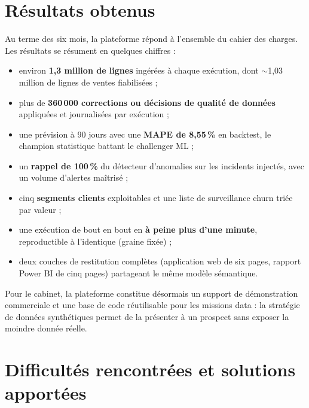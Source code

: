 \documentclass[12pt,a4paper]{report}
\begin{document}
\section{Résultats obtenus}

Au terme des six mois, la plateforme répond à l'ensemble du cahier des
charges. Les résultats se résument en quelques chiffres :

\begin{itemize}
  \item environ \textbf{1,3 million de lignes} ingérées à chaque exécution,
    dont $\sim$1,03 million de lignes de ventes fiabilisées ;
  \item plus de \textbf{360\,000 corrections ou décisions de qualité de
    données} appliquées et journalisées par exécution ;
  \item une prévision à 90 jours avec une \textbf{MAPE de 8,55\,\%} en
    backtest, le champion statistique battant le challenger ML ;
  \item un \textbf{rappel de 100\,\%} du détecteur d'anomalies sur les
    incidents injectés, avec un volume d'alertes maîtrisé ;
  \item cinq \textbf{segments clients} exploitables et une liste de
    surveillance churn triée par valeur ;
  \item une exécution de bout en bout en \textbf{à peine plus d'une minute},
    reproductible à l'identique (graine fixée) ;
  \item deux couches de restitution complètes (application web de six pages,
    rapport Power BI de cinq pages) partageant le même modèle sémantique.
\end{itemize}

Pour le cabinet, la plateforme constitue désormais un support de démonstration
commerciale et une base de code réutilisable pour les missions data : la
stratégie de données synthétiques permet de la présenter à un prospect sans
exposer la moindre donnée réelle.

\section{Difficultés rencontrées et solutions apportées}
\end{document}
